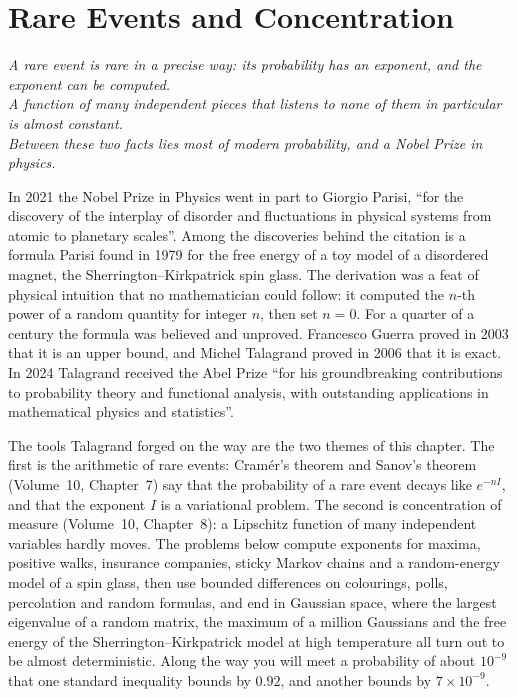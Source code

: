 \chapter{Rare Events and Concentration}

\begin{center}\itshape
A rare event is rare in a precise way: its probability has an exponent, and the exponent can be computed.\\
A function of many independent pieces that listens to none of them in particular is almost constant.\\
Between these two facts lies most of modern probability, and a Nobel Prize in physics.
\end{center}

In 2021 the Nobel Prize in Physics went in part to Giorgio Parisi, ``for the discovery of the interplay of disorder and fluctuations in physical systems from atomic to
planetary scales''. Among the discoveries behind the citation is a formula Parisi found in 1979 for the free energy of a toy model of a disordered magnet, the
Sherrington--Kirkpatrick spin glass. The derivation was a feat of physical intuition that no mathematician could follow: it computed the $n$-th power of a random
quantity for integer $n$, then set $n=0$. For a quarter of a century the formula was believed and unproved. Francesco Guerra proved in 2003 that it is an upper bound,
and Michel Talagrand proved in 2006 that it is exact. In 2024 Talagrand received the Abel Prize ``for his groundbreaking contributions to probability theory and
functional analysis, with outstanding applications in mathematical physics and statistics''.

The tools Talagrand forged on the way are the two themes of this chapter. The first is the arithmetic of rare events: Cram\'er's theorem and Sanov's theorem (Volume~10,
Chapter~7) say that the probability of a rare event decays like $e^{-nI}$, and that the exponent $I$ is a variational problem. The second is concentration of measure
(Volume~10, Chapter~8): a Lipschitz function of many independent variables hardly moves. The problems below compute exponents for maxima, positive walks, insurance
companies, sticky Markov chains and a random-energy model of a spin glass, then use bounded differences on colourings, polls, percolation and random formulas, and end in
Gaussian space, where the largest eigenvalue of a random matrix, the maximum of a million Gaussians and the free energy of the Sherrington--Kirkpatrick model at high
temperature all turn out to be almost deterministic. Along the way you will meet a probability of about $10^{-9}$ that one standard inequality bounds by $0.92$, and
another bounds by $7\times10^{-9}$.

